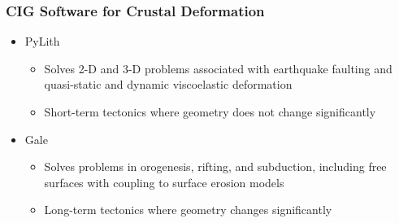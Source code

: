 \documentclass{beamer}
\begin{document}
\begin{frame}
  \frametitle{CIG Software for Crustal Deformation}
  \summary{}

  \begin{itemize}
  \item PyLith
    \begin{itemize}
    \item Solves 2-D and 3-D problems associated with earthquake
      faulting and quasi-static and dynamic viscoelastic deformation
    \item Short-term tectonics where geometry does not change
      significantly
    \end{itemize}
  \item Gale
    \begin{itemize}
    \item Solves problems in orogenesis, rifting, and subduction,
      including free surfaces with coupling to surface erosion models
    \item Long-term tectonics where geometry changes significantly
    \end{itemize}
  \end{itemize}
 
\end{frame}

 
\end{document}
